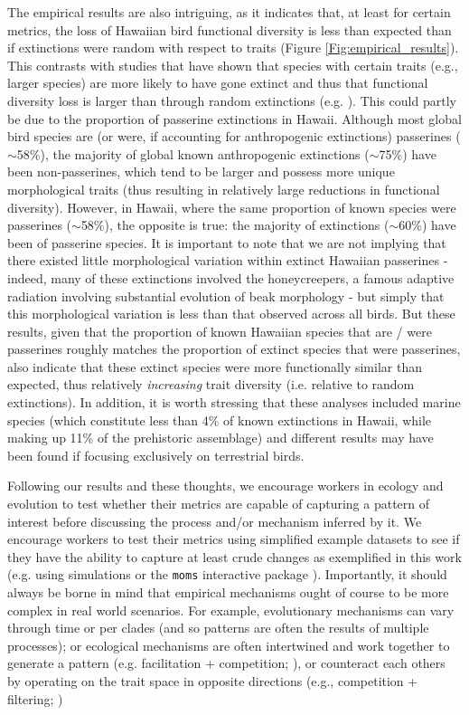 \documentclass[12pt,letterpaper]{article}
\begin{document}
The empirical results are also intriguing, as it indicates that, at least for certain metrics, the loss of Hawaiian bird functional diversity is less than expected than if extinctions were random with respect to traits (Figure \ref{Fig:empirical_results}).
This contrasts with studies that have shown that species with certain traits (e.g., larger species) are more likely to have gone extinct and thus that functional diversity loss is larger than through random extinctions (e.g. \citealt{sayol2021loss,Matthews2022}).
This could partly be due to the proportion of passerine extinctions in Hawaii.
Although most global bird species are (or were, if accounting for anthropogenic extinctions) passerines ($\sim$58\%), the majority of global known anthropogenic extinctions ($\sim$75\%) have been non-passerines, which tend to be larger and possess more unique morphological traits (thus resulting in relatively large reductions in functional diversity).
However, in Hawaii, where the same proportion of known species were passerines ($\sim$58\%), the opposite is true: the majority of extinctions ($\sim$60\%) have been of passerine species.
It is important to note that we are not implying that there existed little morphological variation within extinct Hawaiian passerines - indeed, many of these extinctions involved the honeycreepers, a famous adaptive radiation involving substantial evolution of beak morphology \citep{Walther2022} - but simply that this morphological variation is less than that observed across all birds.
But these results, given that the proportion of known Hawaiian species that are / were passerines roughly matches the proportion of extinct species that were passerines,  also indicate that these extinct species were more functionally similar than expected, thus relatively \textit{increasing} trait diversity (i.e. relative to random extinctions).
In addition, it is worth stressing that these analyses included marine species (which constitute less than 4\% of  known extinctions in Hawaii, while making up 11\% of the prehistoric assemblage) and different results may have been found if focusing exclusively on terrestrial birds.

Following our results and these thoughts, we encourage workers in ecology and evolution to test whether their metrics are capable of capturing a pattern of interest before discussing the process and/or mechanism inferred by it.
We encourage workers to test their metrics using simplified example datasets to see if they have the ability to capture at least crude changes as exemplified in this work (e.g. using simulations \citealt{guillerme2024treats} or the \texttt{moms} interactive package \citealt{guillerme2020shifting}).
Importantly, it should always be borne in mind that empirical mechanisms ought of course to be more complex in real world scenarios.
For example, evolutionary mechanisms can vary through time or per clades (and so patterns are often the results of multiple processes); or ecological mechanisms are often intertwined and work together to generate a pattern (e.g. facilitation + competition; \citealt{danet2024species}), or counteract each others by operating on the trait space in opposite directions (e.g., competition + filtering; \citealt{mammola2024functional})
\end{document}

